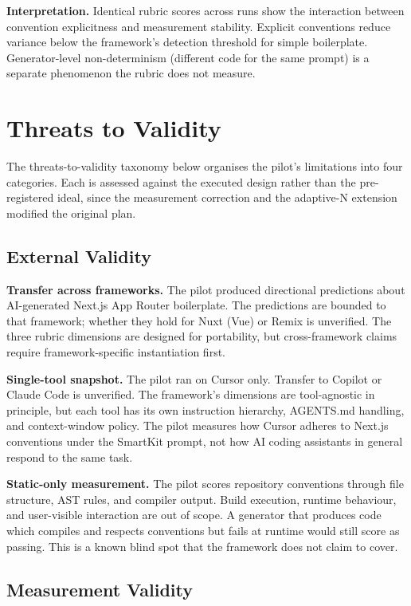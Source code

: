 \documentclass[12pt,a4paper]{report}
\begin{document}
\textbf{Interpretation.} Identical rubric scores across runs show the interaction between convention explicitness and measurement stability. Explicit conventions reduce variance below the framework's detection threshold for simple boilerplate. Generator-level non-determinism (different code for the same prompt) is a separate phenomenon the rubric does not measure.



\section{Threats to Validity}
\label{sec:threats}

The threats-to-validity taxonomy below organises the pilot's limitations into four categories. Each is assessed against the executed design rather than the pre-registered ideal, since the measurement correction and the adaptive-N extension modified the original plan.

\subsection{External Validity}
\label{sec:external-validity}

\textbf{Transfer across frameworks.} The pilot produced directional predictions about AI-generated Next.js App Router boilerplate. The predictions are bounded to that framework; whether they hold for Nuxt (Vue) or Remix is unverified. The three rubric dimensions are designed for portability, but cross-framework claims require framework-specific instantiation first.

\textbf{Single-tool snapshot.} The pilot ran on Cursor only. Transfer to Copilot or Claude Code is unverified. The framework's dimensions are tool-agnostic in principle, but each tool has its own instruction hierarchy, AGENTS.md handling, and context-window policy. The pilot measures how Cursor adheres to Next.js conventions under the SmartKit prompt, not how AI coding assistants in general respond to the same task.

\textbf{Static-only measurement.} The pilot scores repository conventions through file structure, AST rules, and compiler output. Build execution, runtime behaviour, and user-visible interaction are out of scope. A generator that produces code which compiles and respects conventions but fails at runtime would still score as passing. This is a known blind spot that the framework does not claim to cover.

\subsection{Measurement Validity}
\label{sec:measurement-validity}
\end{document}
